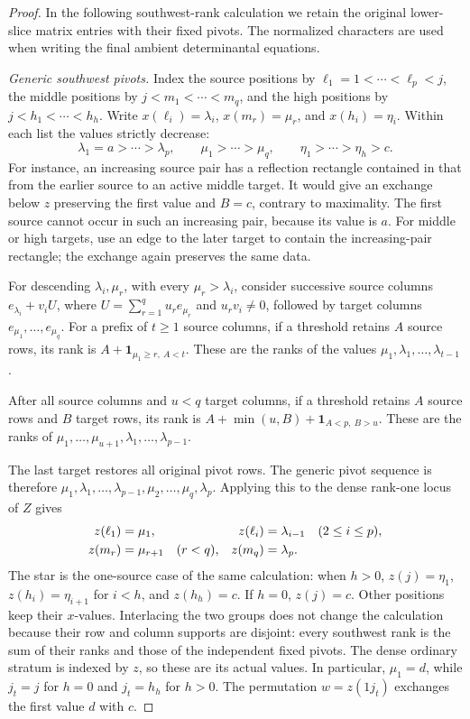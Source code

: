 \begin{proof}
In the following southwest-rank calculation we retain the original
lower-slice matrix entries with their fixed pivots. The normalized
characters are used when writing the final ambient determinantal equations.

\smallskip\noindent\emph{Generic southwest pivots.}
Index the source positions by $\ell_1=1<\cdots<\ell_p<j$, the
middle positions by $j<m_1<\cdots<m_q$, and the high positions by
$j<h_1<\cdots<h_h$. Write $x(\ell_i)=\lambda_i$, $x(m_r)=\mu_r$,
and $x(h_i)=\eta_i$. Within each list the values strictly decrease:
\[
 \lambda_1=a>\cdots>\lambda_p,\qquad
 \mu_1>\cdots>\mu_q,\qquad
 \eta_1>\cdots>\eta_h>c.
\]
For instance, an increasing source pair has a reflection rectangle
contained in that from the earlier source to an active middle target.
It would give an exchange below $z$ preserving the first value and
$B=c$, contrary to maximality. The first source cannot occur
in such an increasing pair, because its value is $a$. For middle or high targets,
use an edge to the later target to contain the increasing-pair
rectangle; the exchange again preserves the same data.

For descending $\lambda_i,\mu_r$, with every $\mu_r>\lambda_i$,
consider successive source columns
$e_{\lambda_i}+v_iU$, where $U=\sum_{r=1}^q u_re_{\mu_r}$ and
$u_rv_i\neq0$, followed by target columns
$e_{\mu_1},\ldots,e_{\mu_q}$. For a prefix of $t\geq1$ source
columns, if a threshold retains $A$ source rows, its rank is
$A+\mathbf1_{\mu_1\geq r,\ A<t}$. These are the ranks of the
values $\mu_1,\lambda_1,\ldots,\lambda_{t-1}$.

After all source columns and $u<q$ target columns, if a threshold
retains $A$ source rows and $B$ target rows, its rank is
$A+\min(u,B)+\mathbf1_{A<p,\ B>u}$. These are the ranks of
$\mu_1,\ldots,\mu_{u+1},\lambda_1,\ldots,\lambda_{p-1}$.

The last target restores all original pivot rows. The generic pivot
sequence is therefore
$\mu_1,\lambda_1,\ldots,\lambda_{p-1},
\mu_2,\ldots,\mu_q,\lambda_p$.
Applying this to the dense rank-one locus of $Z$ gives
\begin{align}
 z(\ell_1)&=\mu_1,&
 z(\ell_i)&=\lambda_{i-1}\quad(2\leq i\leq p),\notag\\
 z(m_r)&=\mu_{r+1}\quad(r<q),&
 z(m_q)&=\lambda_p.\label{ta:eq:middle_pivots}
\end{align}
The star is the one-source case of the same calculation: when $h>0$,
$z(j)=\eta_1$, $z(h_i)=\eta_{i+1}$ for $i<h$, and $z(h_h)=c$.
If $h=0$, $z(j)=c$. Other positions keep their $x$-values.
Interlacing the two groups does not change the calculation because
their row and column supports are disjoint: every southwest rank is
the sum of their ranks and those of the independent fixed pivots.
The dense ordinary stratum is indexed by $z$, so these are its actual
values. In particular, $\mu_1=d$, while $j_t=j$ for $h=0$ and
$j_t=h_h$ for $h>0$. The permutation $w=z(1j_t)$ exchanges the first
value $d$ with $c$.


\end{proof}
